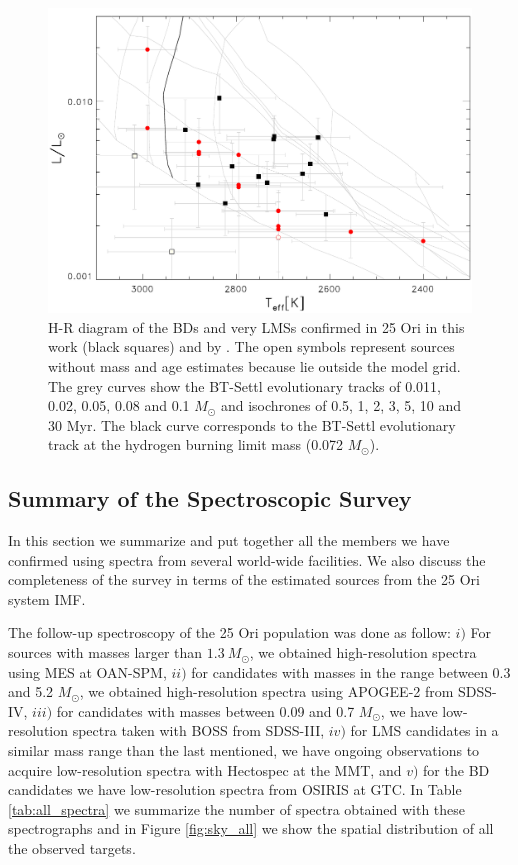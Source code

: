 \documentclass[12pt]{article}
\begin{document}
\begin{figure}%
	\includegraphics[width=1.0\textwidth]{HR_OSIRIS.pdf}
	\caption[H-R diagram of the so far confirmed members with OSIRIS spectra.]{H-R diagram of the BDs and very LMSs confirmed in 25 Ori in this work (black squares) and by \citet[red circles; ][]{Downes2015}. The open symbols represent sources without mass and age estimates because lie outside the model grid. The grey curves show the BT-Settl evolutionary tracks of 0.011, 0.02, 0.05, 0.08 and 0.1 $M_\odot$ and isochrones of 0.5, 1, 2, 3, 5, 10 and 30 Myr. The black curve corresponds to the BT-Settl evolutionary track at the hydrogen burning limit mass (0.072 $M_\odot$).}
	\label{fig_OSIRIS:HR}
\end{figure}

\subsection{Summary of the Spectroscopic Survey}
\label{sec:spectra}
In this section we summarize and put together all the members we have confirmed using spectra from several world-wide facilities. We also discuss the completeness of the survey in terms of the estimated sources from the 25 Ori system IMF. 

The follow-up spectroscopy of the 25 Ori population was done as follow: $i)$ For sources with masses larger than $1.3\ M_\odot$, we obtained high-resolution spectra using MES at OAN-SPM, $ii)$ for candidates with masses in the range between 0.3 and 5.2 $M_\odot$, we obtained high-resolution spectra using APOGEE-2 from SDSS-IV, $iii)$ for candidates with masses between 0.09 and 0.7 $M_\odot$, we have low-resolution spectra taken with BOSS from SDSS-III, $iv)$ for LMS candidates in a similar mass range than the last mentioned, we have ongoing observations to acquire low-resolution spectra with Hectospec at the MMT, and $v)$ for the BD candidates we have low-resolution spectra from OSIRIS at GTC. In Table \ref{tab:all_spectra} we summarize the number of spectra obtained with these spectrographs and in Figure \ref{fig:sky_all} we show the spatial distribution of all the observed targets.
\end{document}
